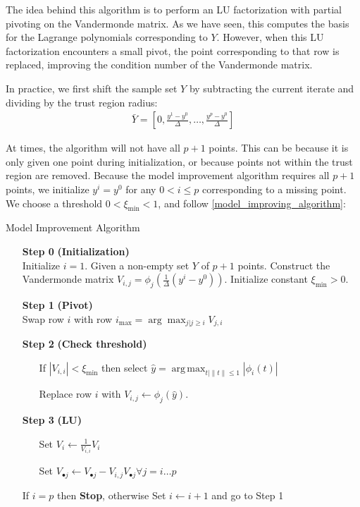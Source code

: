 \documentclass{article}
\theoremstyle{case}
\newcommand{\ximin}{\xi_{\text{min}}}
\DeclareMathOperator*{\argmax}{arg\,max}
\begin{document}
The idea behind this algorithm is to perform an LU factorization with partial pivoting on the Vandermonde matrix.
As we have seen, this computes the basis for the Lagrange polynomials corresponding to $Y$.
However, when this LU factorization encounters a small pivot, the point corresponding to that row is replaced, improving the condition number of the Vandermonde matrix.

In practice, we first shift the sample set $Y$ by subtracting the current iterate and dividing by the trust region radius:
\begin{align}
\bar{Y} = [0, \frac{y^1 - y^0}{\Delta}, \ldots, \frac{y^p - y^0}{\Delta}]
\end{align}

At times, the algorithm will not have all $p+1$ points.
This can be because it is only given one point during initialization, or because points not within the trust region are removed.
Because the model improvement algorithm requires all $p+1$ points, we initialize $y^i = y^0$ for any $0 < i \le p$ corresponding to a missing point.
We choose a threshold $0 < \ximin < 1$, and follow \cref{model_improving_algorithm}:

\begin{algorithm}[H]
    \caption{Model Improvement Algorithm}
    \label{model_improving_algorithm}
    \begin{itemize}
        \item[\textbf{Step 0}] \textbf{(Initialization)} \\
            Initialize $i=1$.
            Given a non-empty set $Y$ of $p+1$ points. 
            Construct the Vandermonde matrix $V_{i,j} = \phi_j(\frac 1 {\Delta}(y^i - y^0))$.
			Initialize constant $\ximin > 0$.
        \item[\textbf{Step 1}] \textbf{(Pivot)} \\
            Swap row $i$ with row $i_{\max} = \arg \max_{j|j\ge i} V_{j,i} $
        
        \item[\textbf{Step 2}] \textbf{(Check threshold)} \begin{itemize}
                \item[] If $|V_{i,i}| < \ximin$ then select \label{next_point} $\hat y = \argmax_{t | \|t\|\le 1} |\phi_i(t)|$
                \item[] Replace row $i$ with $V_{i, j} \gets \phi_j(\hat y)$.
            \end{itemize}
        
        \item[\textbf{Step 3}] \textbf{(LU)} \begin{itemize}
                \item[] Set $V_i \gets \frac{1}{V_{i,i}} V_i$
                \item[] Set $V_{\bullet j} \gets V_{\bullet j} - V_{i,j} V_{\bullet j} \forall j=i \ldots p$
            \end{itemize}
            If $i = p$ then \textbf{Stop}, otherwise Set $i \gets i+1$ and go to Step 1
    \end{itemize}
\end{algorithm}
\end{document}
